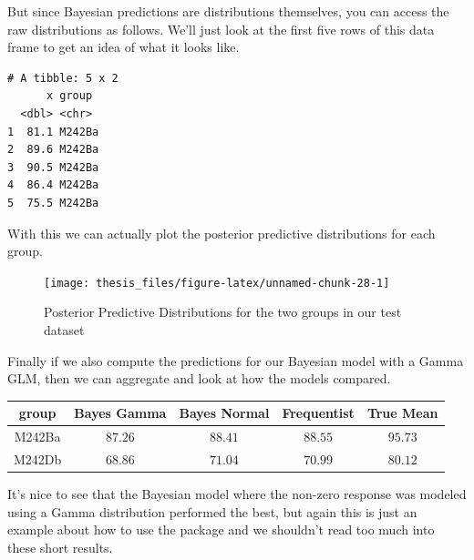 \documentclass[12pt,twoside]{reedthesis}
\newenvironment{Shaded}{\begin{snugshade}}{\end{snugshade}}
\newcommand{\AttributeTok}[1]{\textcolor[rgb]{0.77,0.63,0.00}{#1}}
\newcommand{\ConstantTok}[1]{\textcolor[rgb]{0.00,0.00,0.00}{#1}}
\newcommand{\DecValTok}[1]{\textcolor[rgb]{0.00,0.00,0.81}{#1}}
\newcommand{\FloatTok}[1]{\textcolor[rgb]{0.00,0.00,0.81}{#1}}
\newcommand{\FunctionTok}[1]{\textcolor[rgb]{0.00,0.00,0.00}{#1}}
\newcommand{\NormalTok}[1]{#1}
\newcommand{\SpecialCharTok}[1]{\textcolor[rgb]{0.00,0.00,0.00}{#1}}
\begin{document}
But since Bayesian predictions are distributions themselves, you can access the raw distributions as follows. We'll just look at the first five rows of this data frame to get an idea of what it looks like.
\begin{Shaded}
\end{Shaded}
\begin{verbatim}
# A tibble: 5 x 2
      x group 
  <dbl> <chr> 
1  81.1 M242Ba
2  89.6 M242Ba
3  90.5 M242Ba
4  86.4 M242Ba
5  75.5 M242Ba
\end{verbatim}
With this we can actually plot the posterior predictive distributions for each group.
\begin{Shaded}
\end{Shaded}
\begin{figure}

{\centering \texttt{[image: thesis\_files/figure-latex/unnamed-chunk-28-1]} 

}

\caption{Posterior Predictive Distributions for the two groups in our test dataset}\label{fig:unnamed-chunk-28}
\end{figure}
Finally if we also compute the predictions for our Bayesian model with a Gamma GLM, then we can aggregate and look at how the models compared.
\begin{longtable}{ccccc}
\toprule
group & Bayes Gamma & Bayes Normal & Frequentist & True Mean \\ 
\midrule
M242Ba & $87.26$ & $88.41$ & $88.55$ & $95.73$ \\ 
M242Db & $68.86$ & $71.04$ & $70.99$ & $80.12$ \\ 
\bottomrule
\end{longtable}
It's nice to see that the Bayesian model where the non-zero response was modeled using a Gamma distribution performed the best, but again this is just an example about how to use the package and we shouldn't read too much into these short results.
\end{document}
